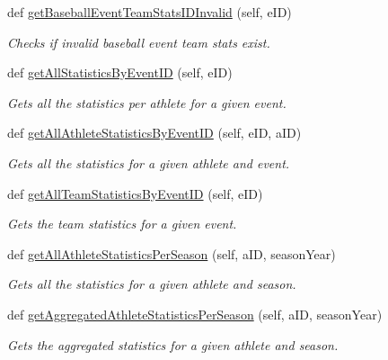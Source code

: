 \begin{DoxyCompactItemize}
def \hyperlink{classhandler_1_1dao_1_1baseball__event__dao_1_1_baseball_event_d_a_o_a709d6118be7ab2b47c57e8bd89d6bcba}{get\+Baseball\+Event\+Team\+Stats\+I\+D\+Invalid} (self, e\+ID)
\begin{DoxyCompactList}\small\item\em Checks if invalid baseball event team stats exist. \end{DoxyCompactList}\item 
def \hyperlink{classhandler_1_1dao_1_1baseball__event__dao_1_1_baseball_event_d_a_o_ac4c5002b51cb2404eddc669adf19c9df}{get\+All\+Statistics\+By\+Event\+ID} (self, e\+ID)
\begin{DoxyCompactList}\small\item\em Gets all the statistics per athlete for a given event. \end{DoxyCompactList}\item 
def \hyperlink{classhandler_1_1dao_1_1baseball__event__dao_1_1_baseball_event_d_a_o_a34037efa7d848d789874181636da0075}{get\+All\+Athlete\+Statistics\+By\+Event\+ID} (self, e\+ID, a\+ID)
\begin{DoxyCompactList}\small\item\em Gets all the statistics for a given athlete and event. \end{DoxyCompactList}\item 
def \hyperlink{classhandler_1_1dao_1_1baseball__event__dao_1_1_baseball_event_d_a_o_a98657990993ba362f863b43e9b9d41af}{get\+All\+Team\+Statistics\+By\+Event\+ID} (self, e\+ID)
\begin{DoxyCompactList}\small\item\em Gets the team statistics for a given event. \end{DoxyCompactList}\item 
def \hyperlink{classhandler_1_1dao_1_1baseball__event__dao_1_1_baseball_event_d_a_o_a064c4288059d76d42b4ea25956177934}{get\+All\+Athlete\+Statistics\+Per\+Season} (self, a\+ID, season\+Year)
\begin{DoxyCompactList}\small\item\em Gets all the statistics for a given athlete and season. \end{DoxyCompactList}\item 
def \hyperlink{classhandler_1_1dao_1_1baseball__event__dao_1_1_baseball_event_d_a_o_a5bb1c3b009fcd9a61c367d3d11b4d45e}{get\+Aggregated\+Athlete\+Statistics\+Per\+Season} (self, a\+ID, season\+Year)
\begin{DoxyCompactList}\small\item\em Gets the aggregated statistics for a given athlete and season. \end{DoxyCompactList}\item 

\end{DoxyCompactItemize}

